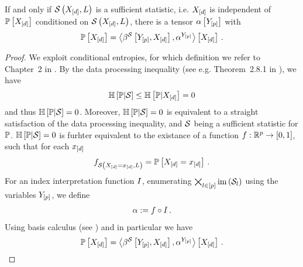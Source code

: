 \begin{theorem}\label{the:sufficientStatisticActCoreExistence}
    If and only if $\mathcal{S}\left(X_{[d]},L\right)$ is a sufficient statistic, i.e. $X_{[d]}$ is independent of $\mathbb{P}\left[X_{[d]}\right]$ conditioned on $\mathcal{S}\left(X_{[d]},L\right)$, there is a tensor $\alpha\left[Y_{[p]}\right]$ with
    \begin{align*}
        \mathbb{P}\left[X_{[d]}\right] = \left\langle \beta^{\mathcal{S}}\left[Y_{[p]},X_{[d]}\right],\alpha^{Y_{[p]}}\right\rangle \left[ X_{[d]} \right] \, .
    \end{align*}
\end{theorem}
\begin{proof}
    We exploit conditional entropies, for which definition we refer to Chapter~2 in \cite{cover_elements_2006}. %
    By the data processing inequality (see e.g. Theorem~2.8.1 in \cite{cover_elements_2006}), we have
    \begin{align*}
        \mathbb{H}\left[\mathbb{P}|\mathcal{S}\right] \leq \mathbb{H}\left[\mathbb{P} |X_{[d]}\right] = 0
    \end{align*}
    and thus $\mathbb{H}\left[\mathbb{P}|\mathcal{S}\right]=0$.
    Moreover, $\mathbb{H}\left[\mathbb{P}|\mathcal{S}\right]=0$ is equivalent to a straight satisfaction of the data processing inequality, and $\mathcal{S}$ being a sufficient statistic for $\mathbb{P}$.
    $\mathbb{H}\left[\mathbb{P}|\mathcal{S}\right]=0$ is furhter equivalent to the existance of a function $f:\mathbb{R}^{p}\rightarrow[0,1]$, such that for each $x_{[d]}$
    \begin{align*}
        f_{\mathcal{S}\left(X_{[d]}=x_{[d]},L\right)} = \mathbb{P}\left[X_{[d]}=x_{[d]}\right] \, .
    \end{align*}
    For an index interpretation function $I$, enumerating $\bigtimes_{l\in[p]}\mathrm{im}\left(\mathcal{S}_{l}\right)$ using the variables $Y_{[p]}$, we define
    \begin{align*}
        \alpha := f \circ I \, .
    \end{align*}
    Using basis calculus (see ) and in particular  we have
    \begin{align*}
        \mathbb{P}\left[X_{[d]}\right] = \left\langle \beta^{\mathcal{S}}\left[Y_{[p]},X_{[d]}\right],\alpha^{Y_{[p]}}\right\rangle \left[ X_{[d]} \right] \, .
    \end{align*}
\end{proof}

